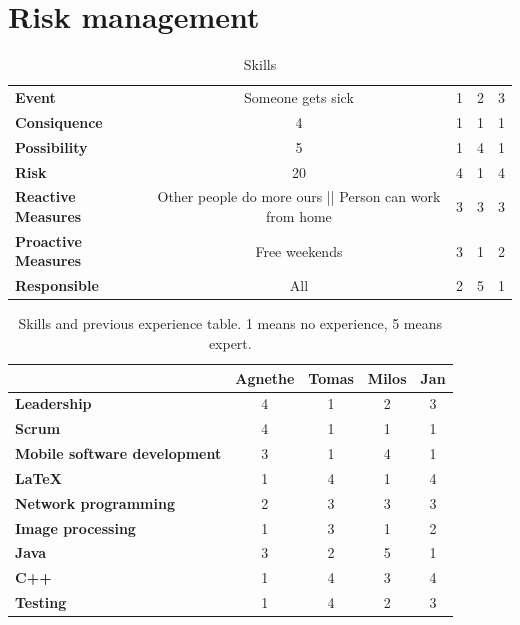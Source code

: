 \documentclass{article}
\newcommand{\ra}[1]{\renewcommand{\arraystretch}{#1}}
\begin{document}
\section{Risk management}

\begin{table}\centering \ra{1.3}
    \caption{Skills}
    \label{tab:skills}
    \vspace{2mm}
    \begin{tabular}{lcccc}
    \toprule
    \midrule
    \textbf{Event                	 } & Someone gets sick  		       & 1     & 2     & 3     \\ 
    \textbf{Consiquence              } & 4       					       & 1     & 1     & 1     \\ 
    \textbf{Possibility				 } & 5         						   & 1     & 4     & 1     \\ 
    \textbf{Risk                     } & 20        						   & 4     & 1     & 4     \\ 
    \textbf{Reactive Measures        } & Other people do more ours || Person can work from home         & 3     & 3     & 3     \\ 
    \textbf{Proactive Measures       } & Free weekends        			   & 3     & 1     & 2     \\ 
    \textbf{Responsible              } & All        					   & 2     & 5     & 1     \\ 
   
    \bottomrule
    \end{tabular}
\end{table}

\begin{table}\centering \ra{1.3}
    \caption{Skills and previous experience table. 1 means no experience, 5 means expert.}
    \label{tab:skills}
    \vspace{2mm}
    \begin{tabular}{lcccc}
    \toprule
                                & Agnethe   & Tomas & Milos & Jan \\
    \midrule
    \textbf{Leadership                 } & 4         & 1     & 2     & 3     \\ 
    \textbf{Scrum                      } & 4         & 1     & 1     & 1     \\ 
    \textbf{Mobile software development} & 3         & 1     & 4     & 1     \\ 
    \textbf{\LaTeX                     } & 1         & 4     & 1     & 4     \\ 
    \textbf{Network programming        } & 2         & 3     & 3     & 3     \\ 
    \textbf{Image processing           } & 1         & 3     & 1     & 2     \\ 
    \textbf{Java                       } & 3         & 2     & 5     & 1     \\ 
    \textbf{C++                        } & 1         & 4     & 3     & 4     \\ 
    \textbf{Testing                    } & 1         & 4     & 2     & 3     \\
    \bottomrule
    \end{tabular}
\end{table}
\end{document}
